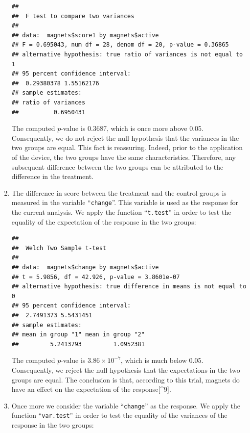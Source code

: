 \documentclass[]{krantz}
\makeatletter
\newenvironment{Shaded}{\begin{snugshade}}{\end{snugshade}}
\newcommand{\KeywordTok}[1]{\textcolor[rgb]{0.13,0.29,0.53}{\textbf{#1}}}
\newcommand{\StringTok}[1]{\textcolor[rgb]{0.31,0.60,0.02}{#1}}
\newcommand{\OperatorTok}[1]{\textcolor[rgb]{0.81,0.36,0.00}{\textbf{#1}}}
\newcommand{\NormalTok}[1]{#1}
\newenvironment{kframe}{%
\medskip{}
\setlength{\fboxsep}{.8em}
 \def\at@end@of@kframe{}%
 \ifinner\ifhmode%
  \def\at@end@of@kframe{\end{minipage}}%
  \begin{minipage}{\columnwidth}%
 \fi\fi%
 \def\FrameCommand##1{\hskip\@totalleftmargin \hskip-\fboxsep
 \colorbox{shadecolor}{##1}\hskip-\fboxsep
     \hskip-\linewidth \hskip-\@totalleftmargin \hskip\columnwidth}%
 \MakeFramed {\advance\hsize-\width
   \@totalleftmargin\z@ \linewidth\hsize
   \@setminipage}}%
 {\par\unskip\endMakeFramed%
 \at@end@of@kframe}
\renewenvironment{Shaded}{\begin{kframe}}{\end{kframe}}
\theoremstyle{definition}
\theoremstyle{definition}
\theoremstyle{definition}
\theoremstyle{remark}
\makeatother
\begin{document}
\begin{enumerate}
\begin{verbatim}
## 
##  F test to compare two variances
## 
## data:  magnets$score1 by magnets$active
## F = 0.695043, num df = 28, denom df = 20, p-value = 0.36865
## alternative hypothesis: true ratio of variances is not equal to 1
## 95 percent confidence interval:
##  0.29380378 1.55162176
## sample estimates:
## ratio of variances 
##          0.6950431
\end{verbatim}

  The computed \(p\)-value is 0.3687, which is once more above 0.05.
  Consequently, we do not reject the null hypothesis that the variances
  in the two groups are equal. This fact is reassuring. Indeed, prior to
  the application of the device, the two groups have the same
  characteristics. Therefore, any subsequent difference between the two
  groups can be attributed to the difference in the treatment.
\item
  The difference in score between the treatment and the control groups
  is measured in the variable ``\texttt{change}''. This variable is used
  as the response for the current analysis. We apply the function
  ``\texttt{t.test}'' in order to test the equality of the expectation
  of the response in the two groups:

\begin{Shaded}
\end{Shaded}

\begin{verbatim}
## 
##  Welch Two Sample t-test
## 
## data:  magnets$change by magnets$active
## t = 5.9856, df = 42.926, p-value = 3.8601e-07
## alternative hypothesis: true difference in means is not equal to 0
## 95 percent confidence interval:
##  2.7491373 5.5431451
## sample estimates:
## mean in group "1" mean in group "2" 
##         5.2413793         1.0952381
\end{verbatim}

  The computed \(p\)-value is \(3.86\times 10^{-7}\), which is much
  below 0.05. Consequently, we reject the null hypothesis that the
  expectations in the two groups are equal. The conclusion is that,
  according to this trial, magnets do have an effect on the expectation
  of the response{[}\^{}9{]}.
\item
  Once more we consider the variable ``\texttt{change}'' as the
  response. We apply the function ``\texttt{var.test}'' in order to test
  the equality of the variances of the response in the two groups:


\end{enumerate}
\end{document}
